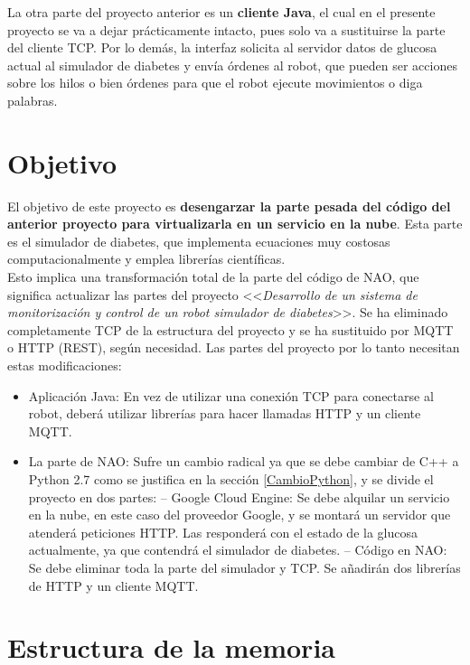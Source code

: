 \documentclass[12pt,spanish,listoffigures,listoftables]{tfgetsinf}
\begin{document}
La otra parte del proyecto anterior es un \textbf{cliente Java}, el cual en el presente proyecto se va a dejar prácticamente intacto, pues solo va a sustituirse la parte del cliente TCP. Por lo demás, la interfaz solicita al servidor datos de glucosa actual al simulador de diabetes y envía órdenes al robot, que pueden ser acciones sobre los hilos o bien órdenes para que el robot ejecute movimientos o diga palabras.

\section{Objetivo}

El objetivo de este proyecto es \textbf{desengarzar la parte pesada del código del anterior proyecto para virtualizarla en un servicio en la nube}. Esta parte es el simulador de diabetes, que implementa ecuaciones muy costosas computacionalmente y emplea librerías científicas. \\

Esto implica una transformación total de la parte del código de NAO, que significa actualizar las partes del proyecto <<\textit{Desarrollo de un sistema de monitorización y control de un robot simulador de diabetes}>>. Se ha eliminado completamente TCP de la estructura del proyecto y se ha sustituido por MQTT o HTTP (REST), según necesidad. Las partes del proyecto por lo tanto necesitan estas modificaciones: 
\begin{itemize}
	\item Aplicación Java: En vez de utilizar una conexión TCP para conectarse al robot, deberá utilizar librerías para hacer llamadas HTTP y un cliente MQTT. 
	\item La parte de NAO: Sufre un cambio radical ya que se debe cambiar de C++ a Python 2.7 como se justifica en la sección \ref{CambioPython}, y se divide el proyecto en dos partes:
		\subitem -- Google Cloud Engine: Se debe alquilar un servicio en la nube, en este caso del proveedor Google, y se montará un servidor que atenderá peticiones HTTP. Las responderá con el estado de la glucosa actualmente, ya que contendrá el simulador de diabetes.
		\subitem -- Código en NAO: Se debe eliminar toda la parte del simulador y TCP. Se añadirán dos librerías de HTTP y un cliente MQTT. 
\end{itemize}

\section{Estructura de la memoria}
\end{document}
